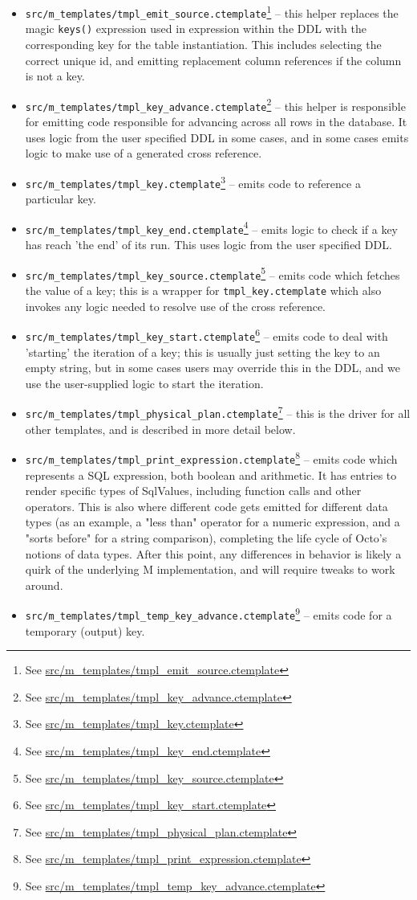 \documentclass[]{article}
\def\code#1{\texttt{#1}}
\newcommand{\gitlab}[1]{\footnote{See \href{https://gitlab.com/YottaDB/DBMS/YDBOcto/blob/master/#1}{#1}}}
\begin{document}
\begin{itemize}
	\item \code{src/m\_templates/tmpl\_emit\_source.ctemplate}\gitlab{src/m\_templates/tmpl\_emit\_source.ctemplate} -- this helper replaces the magic \code{keys()} expression used in expression within the DDL with the corresponding key for the table instantiation. This includes selecting the correct unique id, and emitting replacement column references if the column is not a key.
	\item \code{src/m\_templates/tmpl\_key\_advance.ctemplate}\gitlab{src/m\_templates/tmpl\_key\_advance.ctemplate} -- this helper is responsible for emitting code responsible for advancing across all rows in the database. It uses logic from the user specified DDL in some cases, and in some cases emits logic to make use of a generated cross reference.
	\item \code{src/m\_templates/tmpl\_key.ctemplate}\gitlab{src/m\_templates/tmpl\_key.ctemplate} -- emits code to reference a particular key.
	\item \code{src/m\_templates/tmpl\_key\_end.ctemplate}\gitlab{src/m\_templates/tmpl\_key\_end.ctemplate} -- emits logic to check if a key has reach 'the end' of its run. This uses logic from the user specified DDL.
	\item \code{src/m\_templates/tmpl\_key\_source.ctemplate}\gitlab{src/m\_templates/tmpl\_key\_source.ctemplate} -- emits code which fetches the value of a key; this is a wrapper for \code{tmpl\_key.ctemplate} which also invokes any logic needed to resolve use of the cross reference.
	\item \code{src/m\_templates/tmpl\_key\_start.ctemplate}\gitlab{src/m\_templates/tmpl\_key\_start.ctemplate} -- emits code to deal with 'starting' the iteration of a key; this is usually just setting the key to an empty string, but in some cases users may override this in the DDL, and we use the user-supplied logic to start the iteration.
	\item \code{src/m\_templates/tmpl\_physical\_plan.ctemplate}\gitlab{src/m\_templates/tmpl\_physical\_plan.ctemplate} -- this is the driver for all other templates, and is described in more detail below.
	\item \code{src/m\_templates/tmpl\_print\_expression.ctemplate}\gitlab{src/m\_templates/tmpl\_print\_expression.ctemplate} -- emits code which represents a SQL expression, both boolean and arithmetic. It has entries to render specific types of SqlValues, including function calls and other operators. This is also where different code gets emitted for different data types (as an example, a "less than" operator for a numeric expression, and a "sorts before" for a string comparison), completing the life cycle of Octo's notions of data types. After this point, any differences in behavior is likely a quirk of the underlying M implementation, and will require tweaks to work around.
	\item \code{src/m\_templates/tmpl\_temp\_key\_advance.ctemplate}\gitlab{src/m\_templates/tmpl\_temp\_key\_advance.ctemplate} -- emits code for a temporary (output) key.

\end{itemize}
\end{document}
